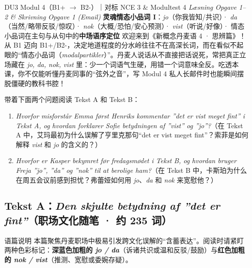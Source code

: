 {DU3 Modul 4（B1+ $\rightarrow$ B2-）｜对标 NCE 3 \& Modultest 4 \textit{Læsning Opgave 1--2 \& Skrivning Opgave 1 (Email)}}
{\textbf{灵魂情态小品词 I}：\textit{jo}（你我皆知/共识）· \textit{da}（当然/略带反驳/惊叹）· \textit{nok}（大概/恐怕/安心预测）· \textit{vist}（听说/好像）· 情态小品词在主句与从句中的\textbf{中场语序定位}}
{欢迎来到《新概念丹麦语 4 · 思辨篇》！从 B1 迈向 B1+/B2-，决定地道程度的分水岭往往不在高深长词，而在看似不起眼的“情态小品词（\textit{modalpartikler}）”。丹麦人说话从不直接把话说死，常把真正立场藏在 \textit{jo, da, nok, vist} 里：少一个词语气生硬，用错一个词意味全反。吃透本课，你不仅能听懂丹麦同事的“弦外之音”，写 Modul 4 私人长邮件时也能瞬间摆脱僵硬的教科书腔！}

\begin{foerduleaeser}
带着下面两个问题阅读 Tekst A 和 Tekst B：
\begin{enumerate}
  \item \textit{Hvorfor misforstår Emma først Henriks kommentar ”det er vist meget fint” i Tekst A, og hvordan forklarer Sofie betydningen af ”vist” og ”jo”?}（在 Tekst A 中，艾玛最初为什么误解了亨里克那句“det er vist meget fint”？索菲是如何解释 \textit{vist} 和 \textit{jo} 的含义的？）
  \item \textit{Hvorfor er Kasper bekymret før fredagsmødet i Tekst B, og hvordan bruger Freja ”jo”, ”da” og ”nok” til at berolige ham?}（在 Tekst B 中，卡斯珀为什么在周五会议前感到担忧？弗蕾娅如何用 \textit{jo}、\textit{da} 和 \textit{nok} 来宽慰他？）
\end{enumerate}
\end{foerduleaeser}


\subsection*{Tekst A：\textit{Den skjulte betydning af ”det er fint”}（职场文化随笔 · 约 235 词）}

\begin{tipbox}{语篇说明}
本篇聚焦丹麦职场中极易引发跨文化误解的“含蓄表达”。阅读时请紧盯两种色彩标记：\textbf{\color{NCDNavy}深蓝色加粗的 \textit{jo / da}}（诉诸共识或温和反驳/鼓励）与\textbf{\color{NCDRed}红色加粗的 \textit{nok / vist}}（推测、宽慰或委婉存疑）。
\end{tipbox}

